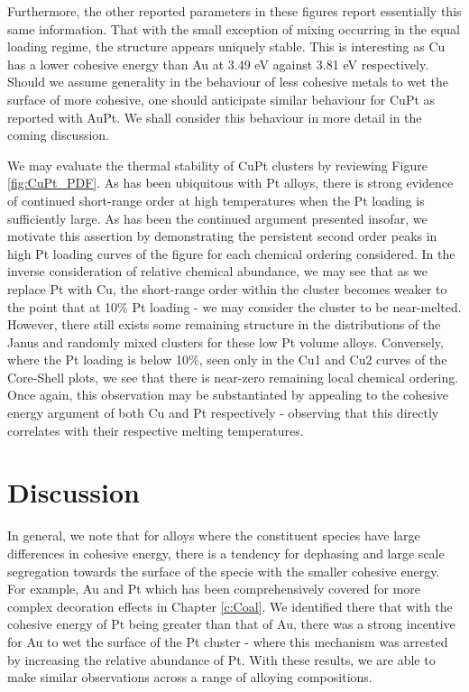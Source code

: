 Furthermore, the other reported parameters in these figures report essentially this same information. That with the small exception of mixing occurring in the equal loading regime, the structure appears uniquely stable. This is interesting as Cu has a lower cohesive energy than Au at 3.49 eV against 3.81 eV respectively. Should we assume generality in the behaviour of less cohesive metals to wet the surface of more cohesive, one should anticipate similar behaviour for CuPt as reported with AuPt. We shall consider this behaviour in more detail in the coming discussion. 

We may evaluate the thermal stability of CuPt clusters by reviewing Figure \ref{fig:CuPt_PDF}. As has been ubiquitous with Pt alloys, there is strong evidence of continued short-range order at high temperatures when the Pt loading is sufficiently large. As has been the continued argument presented insofar, we motivate this assertion by demonstrating the persistent second order peaks in high Pt loading curves of the figure for each chemical ordering considered. In the inverse consideration of relative chemical abundance, we may see that as we replace Pt with Cu, the short-range order within the cluster becomes weaker to the point that at 10\% Pt loading - we may consider the cluster to be near-melted. However, there still exists some remaining structure in the distributions of the Janus and randomly mixed clusters for these low Pt volume alloys. Conversely, where the Pt loading is below 10\%, seen only in the Cu1 and Cu2 curves of the Core-Shell plots, we see that there is near-zero remaining local chemical ordering. Once again, this observation may be substantiated by appealing to the cohesive energy argument of both Cu and Pt respectively - observing that this directly correlates with their respective melting temperatures.

\section{Discussion}
\label{sec:alloy_discuss}
In general, we note that for alloys where the constituent species have large differences in cohesive energy, there is a tendency for dephasing and large scale  segregation towards the surface of the specie with the smaller cohesive energy. For example, Au and Pt which has been comprehensively covered for more complex decoration effects in Chapter \ref{c:Coal}. We identified there that with the cohesive energy of Pt being greater than that of Au, there was a strong incentive for Au to wet the surface of the Pt cluster - where this mechanism was arrested by increasing the relative abundance of Pt. With these results, we are able to make similar observations across a range of alloying compositions.

